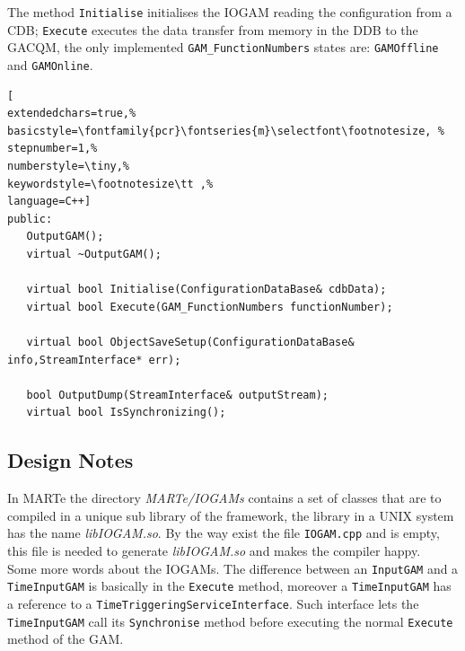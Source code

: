 The method \texttt{Initialise} initialises the IOGAM reading the configuration from a CDB; \texttt{Execute} executes the data transfer from memory in the DDB to the GACQM, the only implemented \texttt{GAM\_FunctionNumbers} states are: \texttt{GAMOffline} and \texttt{GAMOnline}.

\begin{lstlisting}[
extendedchars=true,%
basicstyle=\fontfamily{pcr}\fontseries{m}\selectfont\footnotesize, %
stepnumber=1,%
numberstyle=\tiny,%
keywordstyle=\footnotesize\tt ,%
language=C++]
public:
   OutputGAM();
   virtual ~OutputGAM();

   virtual bool Initialise(ConfigurationDataBase& cdbData);
   virtual bool Execute(GAM_FunctionNumbers functionNumber);

   virtual bool ObjectSaveSetup(ConfigurationDataBase& info,StreamInterface* err);

   bool OutputDump(StreamInterface& outputStream);
   virtual bool IsSynchronizing();
\end{lstlisting}



\subsection{Design Notes}
In MARTe the directory \textit{MARTe/IOGAMs} contains a set of classes that are to compiled in a unique sub library of the framework, the library in a UNIX system has the name \textit{libIOGAM.so}. By the way exist the file \texttt{IOGAM.cpp} and is empty, this file is needed to generate \textit{libIOGAM.so} and makes the compiler happy. \\


Some more words about the IOGAMs. The difference between an \texttt{InputGAM} and a \texttt{TimeInputGAM} is basically in the \texttt{Execute} method, moreover a \texttt{TimeInputGAM} has a reference to a \texttt{TimeTriggeringServiceInterface}. Such interface lets the \texttt{TimeInputGAM} call its \texttt{Synchronise} method before executing the normal \texttt{Execute} method of the GAM. \\


